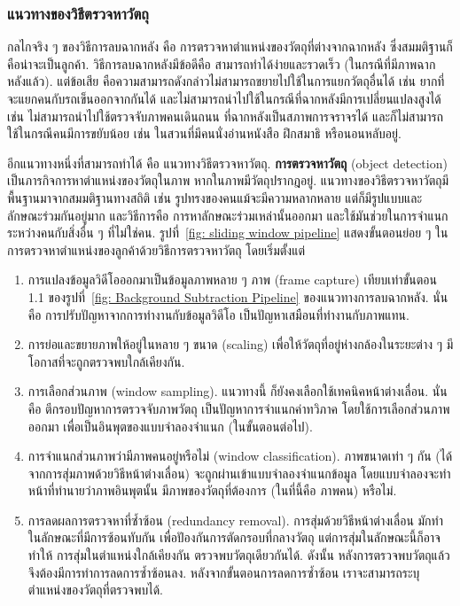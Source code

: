 \subsubsection{แนวทางของวิธีตรวจหาวัตถุ}
\label{sec: classic object detection}

กลไกจริง ๆ ของวิธีการลบฉากหลัง คือ การตรวจหาตำแหน่งของวัตถุที่ต่างจากฉากหลัง ซึ่งสมมติฐานก็คือน่าจะเป็นลูกค้า.
วิธีการลบฉากหลังมีข้อดีคือ สามารถทำได้ง่ายและรวดเร็ว (ในกรณีที่มีภาพฉากหลังแล้ว).
แต่ข้อเสีย คือความสามารถดังกล่าวไม่สามารถขยายไปใช้ในการแยกวัตถุอื่นได้
เช่น ยากที่จะแยกคนกับรถเข็นออกจากกันได้
และไม่สามารถนำไปใช้ในกรณีที่ฉากหลังมีการเปลี่ยนแปลงสูงได้ เช่น ไม่สามารถนำไปใช้ตรวจจับภาพคนเดินถนน ที่ฉากหลังเป็นสภาพการจราจรได้
และก็ไม่สามารถใช้ในกรณีคนมีการขยับน้อย เช่น ในสวนที่มีคนนั่งอ่านหนังสือ ฝึกสมาธิ หรือนอนหลับอยู่.

อีกแนวทางหนึ่งที่สามารถทำได้ คือ แนวทางวิธีตรวจหาวัตถุ.
\textbf{การตรวจหาวัตถุ} (object detection) เป็นภารกิจการหาตำแหน่งของวัตถุในภาพ หากในภาพมีวัตถุปรากฎอยู่.
แนวทางของวิธีตรวจหาวัตถุมีพื้นฐานมาจากสมมติฐานทางสถิติ 
เช่น รูปทรงของคนแม้จะมีความหลากหลาย
แต่ก็มีรูปแบบและลักษณะร่วมกันอยู่มาก 
และวิธีการคือ การหาลักษณะร่วมเหล่านั้นออกมา
และใช้มันช่วยในการจำแนกระหว่างคนกับสิ่งอื่น ๆ ที่ไม่ใช่คน. 
%
รูปที่~\ref{fig: sliding window pipeline} แสดงขั้นตอนย่อย ๆ ในการตรวจหาตำแหน่งของลูกค้าด้วยวิธีการตรวจหาวัตถุ โดยเริ่มตั้งแต่
%
\begin{enumerate}
	\item การแปลงข้อมูลวิดีโอออกมาเป็นข้อมูลภาพหลาย ๆ ภาพ (frame capture) เทียบเท่าขั้นตอน 1.1 ของรูปที่~\ref{fig: Background Subtraction Pipeline} ของแนวทางการลบฉากหลัง.
	นั่นคือ การปรับปัญหาจากการทำงานกับข้อมูลวิดีโอ เป็นปัญหาเสมือนที่ทำงานกับภาพแทน.
	\item การย่อและขยายภาพให้อยู่ในหลาย ๆ ขนาด (scaling)  
	เพื่อให้วัตถุที่อยู่ห่างกล้องในระยะต่าง ๆ มีโอกาสที่จะถูกตรวจพบใกล้เคียงกัน.
	\item การเลือกส่วนภาพ (window sampling).
	แนวทางนี้ ก็ยังคงเลือกใช้เทคนิคหน้าต่างเลื่อน.
	นั่นคือ ตีกรอบปัญหาการตรวจจับภาพวัตถุ เป็นปัญหาการจำแนกค่าทวิภาค 
	โดยใช้การเลือกส่วนภาพออกมา เพื่อเป็นอินพุตของแบบจำลองจำแนก (ในขั้นตอนต่อไป).
	\item การจำแนกส่วนภาพว่ามีภาพคนอยู่หรือไม่ (window classification).
	ภาพขนาดเท่า ๆ กัน (ได้จากการสุ่มภาพด้วยวิธีหน้าต่างเลื่อน) จะถูกผ่านเข้าแบบจำลองจำแนกข้อมูล
	โดยแบบจำลองจะทำหน้าที่ทำนายว่าภาพอินพุตนั้น มีภาพของวัตถุที่ต้องการ (ในที่นี้คือ ภาพคน) หรือไม่.
	\item การลดผลการตรวจหาที่ซ้ำซ้อน (redundancy removal). 
	การสุ่มด้วยวิธีหน้าต่างเลื่อน มักทำในลักษณะที่มีการซ้อนทับกัน เพื่อปัองกันการตัดกรอบที่กลางวัตถุ
	แต่การสุ่มในลักษณะนี้ก็อาจทำให้ การสุ่มในตำแหน่งใกล้เคียงกัน ตรวจพบวัตถุเดียวกันได้.
	ดังนั้น หลังการตรวจพบวัตถุแล้ว จึงต้องมีการทำการลดการซ้ำซ้อนลง.
	หลังจากขั้นตอนการลดการซ้ำซ้อน เราจะสามารถระบุตำแหน่งของวัตถุที่ตรวจพบได้.
\end{enumerate}

